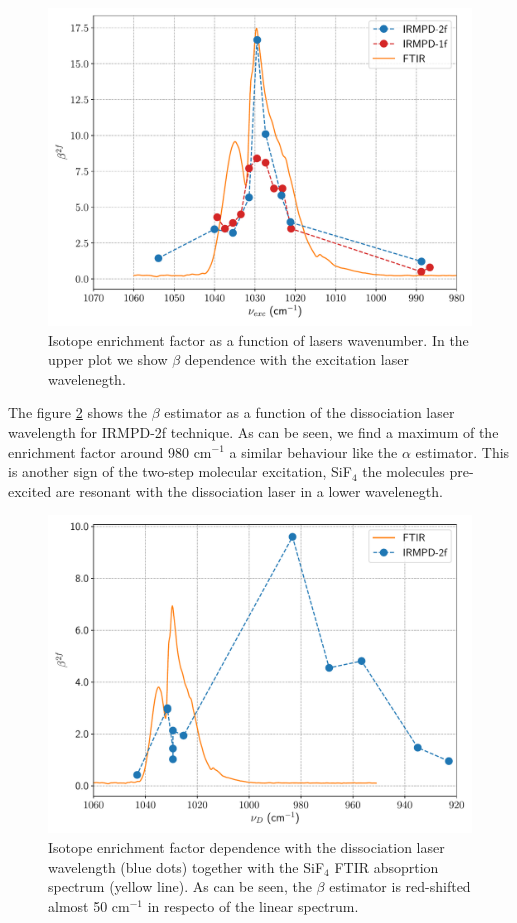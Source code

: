 \documentclass[global,twocolumn]{svjour}
\begin{document}
\begin{figure}[h]
	\centering
	\includegraphics[width = 1\linewidth]{figures/beta_30_nu_bombeo.pdf}
	\caption{\label{fig:beta_spec_excitation} Isotope enrichment factor as a function of lasers wavenumber. In the upper plot we show $\beta$ dependence with the excitation laser wavelenegth.}
\end{figure}

The figure \ref{fig:beta_spec_dissociation} shows the $\beta$ estimator as a function of the dissociation laser wavelength for IRMPD-2f technique. As can be seen, we find a maximum of the enrichment factor around 980 cm$^{-1}$ a similar behaviour like the $\alpha$ estimator. This is another sign of the two-step molecular excitation, SiF$_{4}$ the molecules pre-excited are resonant with the dissociation laser in a lower wavelenegth.

\begin{figure}[h]
	\centering
	\includegraphics[width = 1\linewidth]{figures/beta_30_nu_diso.pdf}
	\caption{Isotope enrichment factor dependence with the dissociation laser wavelength (blue dots) together with the SiF$_{4}$ FTIR absoprtion spectrum (yellow line). As can be seen, the $\beta$ estimator is red-shifted almost 50 cm$^{-1}$ in respecto of the linear spectrum.}
	\label{fig:beta_spec_dissociation}
\end{figure}
\end{document}
